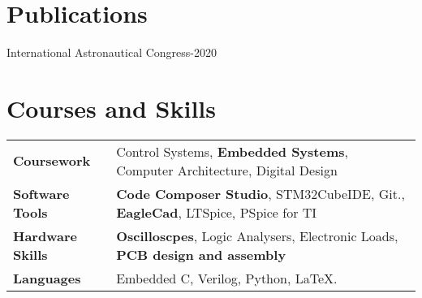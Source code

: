 \documentclass{resume}
\begin{document}
\vspace{-0.5cm}
\section{Publications}
 { International Astronautical Congress-2020}
\vspace{-0.5cm}
\section{Courses and Skills}
\vspace{-0.6cm}
\begin{table}[!htb]
    \begin{tabular}{l|l}
    \textbf{Coursework}        &   Control Systems, \textbf{Embedded Systems}, Computer Architecture, Digital Design\\
    \textbf{Software Tools}&   \textbf{Code Composer Studio}, STM32CubeIDE, Git., \textbf{EagleCad}, LTSpice, PSpice for TI\\
    \textbf{Hardware Skills}    &   \textbf{Oscilloscpes}, Logic Analysers, Electronic Loads, \textbf{PCB design and assembly}\\
    \textbf{Languages}    &   Embedded C, Verilog, Python, \LaTeX.\\
    \end{tabular}
\end{table}
\vspace{-0.8cm}
\end{document}
